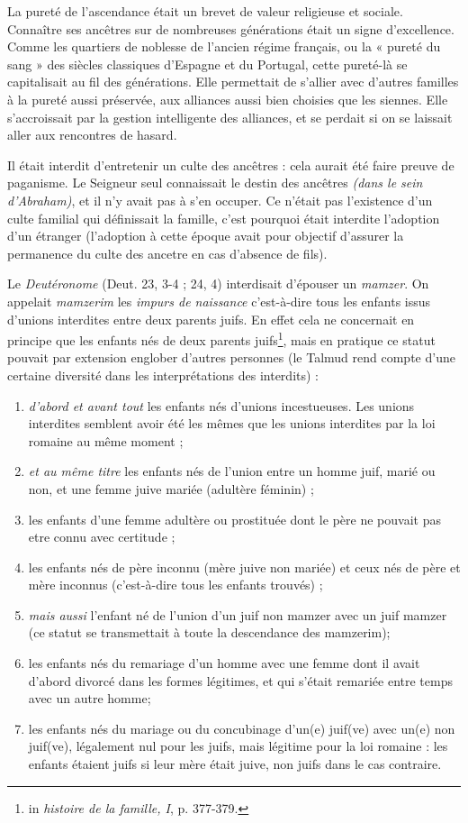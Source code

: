  
 
 La pureté de l'ascendance était un brevet de valeur religieuse et sociale. Connaître ses ancêtres sur de nombreuses générations était un signe d'excellence. Comme les quartiers de noblesse de l'ancien régime français, ou la « pureté du sang » des siècles classiques d'Espagne et du Portugal, cette pureté-là se capitalisait au fil des générations. Elle permettait de s'allier avec d'autres familles à la pureté aussi préservée, aux alliances aussi bien choisies que les siennes. Elle s'accroissait par la gestion intelligente des alliances, et se perdait si on se laissait aller aux rencontres de hasard. 

 

 Il était interdit d'entretenir un culte des ancêtres : cela aurait été faire preuve de paganisme. Le Seigneur seul connaissait le destin des ancêtres \emph{(dans le sein d'Abraham)}, et il n'y avait pas à s'en occuper. Ce n'était pas l'existence d'un culte familial qui définissait la famille, c'est pourquoi était interdite l'adoption d'un étranger (l'adoption à cette époque avait pour objectif d'assurer la permanence du culte des ancetre en cas d'absence de fils). 

 Le \emph{Deutéronome} (Deut. 23, 3-4 ; 24, 4) interdisait d'épouser un \emph{mamzer}. On appelait \emph{mamzerim} les \emph{impurs de naissance}  c'est-à-dire tous les enfants issus d'unions interdites entre deux parents juifs. En effet cela ne concernait en principe que les enfants nés de deux parents juifs\footnote{in \emph{histoire de la famille, I}, p. 377-379. }, mais en pratique ce statut pouvait par extension englober d'autres personnes (le Talmud rend compte d'une certaine diversité dans les interprétations des interdits) : 
 \begin{enumerate}
 \item \emph{d'abord et avant tout} les enfants nés d'unions incestueuses. Les unions interdites semblent avoir été les mêmes que les unions interdites par la loi romaine au même moment ;
 \item \emph{et au même titre} les enfants nés de l'union entre un homme juif, marié ou non, et une femme juive mariée (adultère féminin) ;
 \item les enfants d'une femme adultère ou prostituée dont le père ne pouvait pas etre connu avec certitude ;
 \item les enfants nés de père inconnu (mère juive non mariée) et ceux nés de père et mère inconnus (c'est-à-dire tous les enfants trouvés) ;
 \item \emph{mais aussi} l'enfant né de l'union d'un juif non mamzer avec un juif mamzer (ce statut se transmettait à toute la descendance des mamzerim);
\item les enfants nés du remariage d'un homme avec une femme dont il avait d'abord divorcé dans les formes légitimes, et qui s'était remariée entre temps avec un autre homme;
\item les enfants nés du mariage ou du concubinage d'un(e) juif(ve) avec un(e) non juif(ve), légalement nul pour les juifs, mais légitime pour la loi romaine : les enfants étaient juifs si leur mère était juive, non juifs dans le cas contraire.
\end{enumerate}

